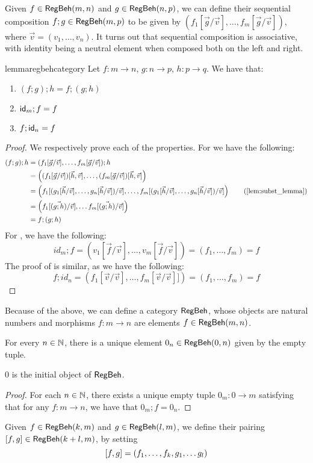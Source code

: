 	Given $f \in \mathsf{RegBeh}(m,n)$ and $g \in \mathsf{RegBeh}(n,p)$, we can define their sequential composition $f;g \in \mathsf{RegBeh}(m,p)$ to be given by $(f_1[\vec{g} / \vec{v}], \dots, f_m[\vec{g}/ \vec{v}])$, where $\vec{v}=(v_1, \dots, v_n)$. It turns out that sequential composition is associative, with identity being a neutral element when composed both on the left and right.
 \begin{restatable}{lemma}{regbehcategory}\label{lem:comp_associative}
	Let $f \colon m \to n$, $g \colon n \to p$, $h \colon p \to q$. We have that: 
	\begin{enumerate}
		\item $(f;g);h = f;(g;h)$
		\item $\mathsf{id}_m ; f = f$
		\item $f ; \mathsf{id}_n = f$
	\end{enumerate}	
\end{restatable}
\begin{proof}
	We respectively prove each of the properties. For  we have the following:
	\begin{align*}
			(f ; g) ; h &= (f_1[\vec{g}/\vec{v}], \dots, f_m[\vec{g}/\vec{v}]);h \\
			&= \left((f_1[\vec{g}/\vec{v}])[\vec{h}, \vec{v}], \dots, (f_m[\vec{g}/\vec{v}])[\vec{h}, \vec{v}]\right)\\
			&= \left(f_1[(g_1[\vec{h}/\vec{v}], \dots, g_n[\vec{h}/\vec{v}])/\vec{v}],\dots, f_m[(g_1[\vec{h}/\vec{v}], \dots, g_n[\vec{h}/\vec{v}])/\vec{v}]\right) \tag{\Cref{lem:subst_lemma}} \\
			&= \left(f_1 [\vec{(g;h)}/\vec{v}], \dots f_m [\vec{(g;h)}/\vec{v}] \right) \\
			&= f ; (g;h)
		\end{align*}
	For , we have the following:
	$$id_m ; f = (v_1[\vec{f}/\vec{v}], \dots, v_m[\vec{f}/\vec{v}])=(f_1, \dots, f_m) = f$$
	The proof of  is similar, as we have the following: $$f ; id_n = (f_1[\vec{v}/\vec{v}], \dots, f_m[\vec{v}/\vec{v}]]) = (f_1, \dots, f_m) = f$$
\end{proof}

Because of the above, we can define a category $\mathsf{RegBeh}$, whose objects are natural numbers and morphisms $f \colon m \to n$ are elements $f \in \mathsf{RegBeh}(m,n)$. 

 For every $n \in \mathbb{N}$, there is a unique element $0_n \in \mathsf{RegBeh}(0,n)$ given by the empty tuple.
 \begin{lemma}
	$0$ is the initial object of $\mathsf{RegBeh}$.
\end{lemma}
\begin{proof}
For each $n \in \mathbb{N}$, there exists a unique empty tuple $0_m \colon 0 \to m$ satisfying that for any $f \colon m \to n$, we have that $0_m ; f = 0_n$.
\end{proof}
 Given $f \in \mathsf{RegBeh}(k,m)$ and $g \in \mathsf{RegBeh}(l,m)$, we define their pairing $[ f , g ] \in \mathsf{RegBeh} (k + l,m)$, by setting
 \begin{equation}\label{c3:eqn:mediating}
 	[ f , g ] = (f_1, \dots, f_k, g_1, \dots g_l)
 \end{equation} 
 
